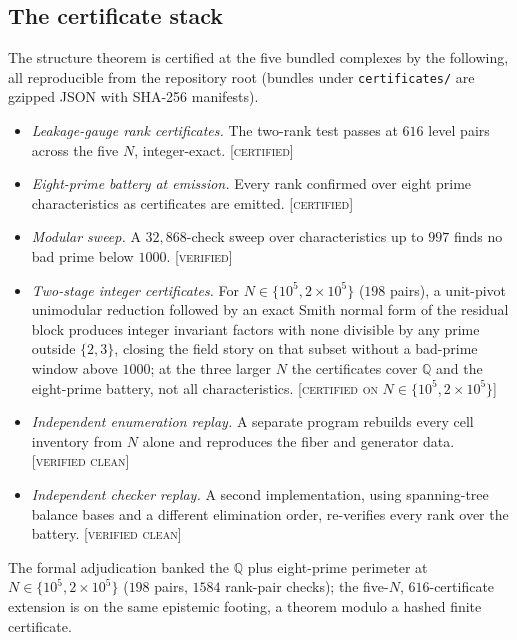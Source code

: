 \documentclass[11pt,reqno]{amsart}
\theoremstyle{plain}
\theoremstyle{definition}
\theoremstyle{plain}
\theoremstyle{definition}
\newcommand{\Q}{\mathbb{Q}}
\newcommand{\st}{\textsc}
\begin{document}
\subsection{The certificate stack}
The structure theorem is certified at the five bundled complexes by the following, all
reproducible from the repository root (bundles under \texttt{certificates/} are gzipped JSON with
SHA-256 manifests).
\begin{itemize}
\item \emph{Leakage-gauge rank certificates.} The two-rank test passes at $616$ level pairs
across the five $N$, integer-exact. \st{[certified]}
\item \emph{Eight-prime battery at emission.} Every rank confirmed over eight prime
characteristics as certificates are emitted. \st{[certified]}
\item \emph{Modular sweep.} A $32{,}868$-check sweep over characteristics up to $997$ finds no
bad prime below $1000$. \st{[verified]}
\item \emph{Two-stage integer certificates.} For $N\in\{10^5,2\times10^5\}$ ($198$ pairs), a
unit-pivot unimodular reduction followed by an exact Smith normal form of the residual block
produces integer invariant factors with none divisible by any prime outside $\{2,3\}$, closing
the field story on that subset without a bad-prime window above $1000$; at the three larger $N$
the certificates cover $\Q$ and the eight-prime battery, not all characteristics. \st{[certified
on $N\in\{10^5,2\times10^5\}$]}
\item \emph{Independent enumeration replay.} A separate program rebuilds every cell inventory
from $N$ alone and reproduces the fiber and generator data. \st{[verified clean]}
\item \emph{Independent checker replay.} A second implementation, using spanning-tree balance
bases and a different elimination order, re-verifies every rank over the battery. \st{[verified
clean]}
\end{itemize}
The formal adjudication banked the $\Q$ plus eight-prime perimeter at $N\in\{10^5,2\times10^5\}$
($198$ pairs, $1584$ rank-pair checks); the five-$N$, $616$-certificate extension is on the same
epistemic footing, a theorem modulo a hashed finite certificate.
\end{document}
